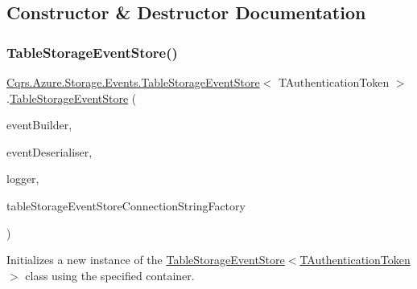 \subsection{Constructor \& Destructor Documentation}
\mbox{\label{classCqrs_1_1Azure_1_1Storage_1_1Events_1_1TableStorageEventStore_af9497418dd323ce2a9d8615ebc7da054_af9497418dd323ce2a9d8615ebc7da054}} 
\subsubsection{\texorpdfstring{Table\+Storage\+Event\+Store()}{TableStorageEventStore()}}
{\footnotesize\ttfamily \hyperlink{classCqrs_1_1Azure_1_1Storage_1_1Events_1_1TableStorageEventStore}{Cqrs.\+Azure.\+Storage.\+Events.\+Table\+Storage\+Event\+Store}$<$ T\+Authentication\+Token $>$.\hyperlink{classCqrs_1_1Azure_1_1Storage_1_1Events_1_1TableStorageEventStore}{Table\+Storage\+Event\+Store} (\begin{DoxyParamCaption}\item[{\hyperlink{interfaceCqrs_1_1Events_1_1IEventBuilder}{I\+Event\+Builder}$<$ T\+Authentication\+Token $>$}]{event\+Builder,  }\item[{\hyperlink{interfaceCqrs_1_1Events_1_1IEventDeserialiser}{I\+Event\+Deserialiser}$<$ T\+Authentication\+Token $>$}]{event\+Deserialiser,  }\item[{I\+Logger}]{logger,  }\item[{\hyperlink{interfaceCqrs_1_1Azure_1_1BlobStorage_1_1ITableStorageStoreConnectionStringFactory}{I\+Table\+Storage\+Store\+Connection\+String\+Factory}}]{table\+Storage\+Event\+Store\+Connection\+String\+Factory }\end{DoxyParamCaption})}



Initializes a new instance of the \hyperlink{classCqrs_1_1Azure_1_1Storage_1_1Events_1_1TableStorageEventStore_af9497418dd323ce2a9d8615ebc7da054_af9497418dd323ce2a9d8615ebc7da054}{Table\+Storage\+Event\+Store$<$\+T\+Authentication\+Token$>$} class using the specified container. 



